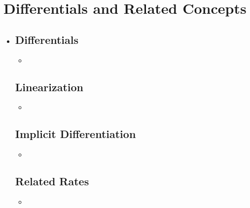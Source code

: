 \section{Differentials and Related Concepts}
\begin{itemize}
  \item []
  
  \subsection{Differentials}
  \begin{itemize}
    \item 
  \end{itemize}

  \subsection{Linearization}
  \begin{itemize}
    \item 
  \end{itemize}

  \subsection{Implicit Differentiation}
  \begin{itemize}
    \item 
  \end{itemize}

  \subsection{Related Rates}
  \begin{itemize}
    \item 
  \end{itemize}
  
\end{itemize}

